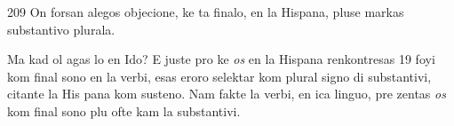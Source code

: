 \begin{VUpage}[213]{209}
On forsan alegos objecione, ke ta finalo, en la Hispana,\nl
pluse markas substantivo plurala.

Ma kad ol agas lo en Ido? E juste pro ke \textit{os} en la Hispana\nl
renkontresas 19 foyi kom final sono en la verbi, esas eroro\nl
selektar  kom plural signo di substantivi, citante la His\cc
pana kom susteno. Nam fakte la verbi, en ica linguo, pre\cc
zentas \textit{os} kom final sono plu ofte kam la substantivi.
\end{VUpage}

